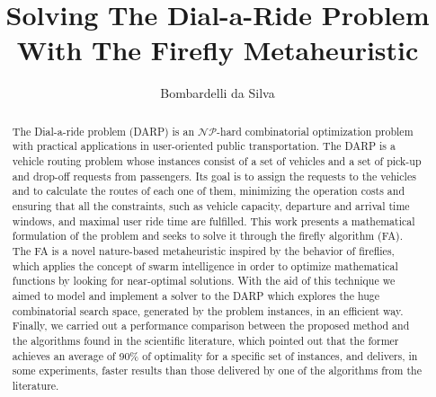 \documentclass[tuberlin,cic,tc,openright,english,noabntcite,oneside]{iiufrgs}
\title{Solving The Dial-a-Ride Problem With The Firefly Metaheuristic}
\author{Bombardelli da Silva}{Fernando}
\begin{document}
\maketitle





\begin{abstract}
The Dial-a-ride problem (DARP) is an $\mathcal{NP}$-hard combinatorial optimization problem with practical applications in user-oriented public transportation. The DARP is a vehicle routing problem whose instances consist of a set of vehicles and a set of pick-up and drop-off requests from passengers. Its goal is to assign the requests to the vehicles and to calculate the routes of each one of them, minimizing the operation costs and ensuring that all the constraints, such as vehicle capacity, departure and arrival time windows, and maximal user ride time are fulfilled. This work presents a mathematical formulation of the problem and seeks to solve it through the firefly algorithm (FA). The FA is a novel nature-based metaheuristic inspired by the behavior of fireflies, which applies the concept of swarm intelligence in order to optimize mathematical functions by looking for near-optimal solutions. With the aid of this technique we aimed to model and implement a solver to the DARP which explores the huge combinatorial search space, generated by the problem instances, in an efficient way. Finally, we carried out a performance comparison between the proposed method and the algorithms found in the scientific literature, which pointed out that the former achieves an average of 90\% of optimality for a specific set of instances, and delivers, in some experiments, faster results than those delivered by one of the algorithms from the literature.
\end{abstract}
\end{document}
